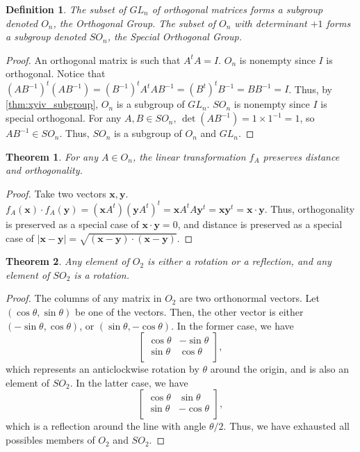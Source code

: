\documentclass{article}
\newtheorem{theorem}{Theorem}[section]
\newtheorem{definition}{Definition}[section]
\begin{document}
\begin{definition}
    \label{def:ortho_group}
    The subset of $GL_n$ of orthogonal matrices forms a subgroup denoted $O_n$, the \emph{Orthogonal Group}.
    The subset of $O_n$ with determinant $+1$ forms a subgroup denoted $SO_n$, the \emph{Special Orthogonal Group}.
\end{definition}
\begin{proof}
    An orthogonal matrix is such that $A^{t}A = I.$
    $O_n$ is nonempty since $I$ is orthogonal.
    Notice that $(AB^{-1})^{t}(AB^{-1}) = (B^{-1})^{t}A^{t}AB^{-1} = (B^{t})^{t}B^{-1} = BB^{-1} = I$.
    Thus, by \autoref{thm:xyiv_subgroup}, $O_n$ is a subgroup of $GL_n$.
    $SO_n$ is nonempty since $I$ is special orthogonal.
    For any $A,B \in SO_n$, $\det(AB^{-1}) = 1\times1^{-1} = 1$, so $AB^{-1} \in SO_n$.
    Thus, $SO_n$ is a subgroup of $O_n$ and $GL_n$.
\end{proof}

\begin{theorem}
    For any $A \in O_n$, the linear transformation $f_A$ preserves distance and orthogonality.
\end{theorem}
\begin{proof}
    Take two vectors $\mathbf{x},\mathbf{y}$.
    $f_A(\mathbf{x}) \cdot f_A(\mathbf{y}) 
    = (\mathbf{x}A^{t})(\mathbf{y}A^{t})^{t}
    = \mathbf{x}A^{t}A\mathbf{y}^{t}
    = \mathbf{x}\mathbf{y}^{t}
    = \mathbf{x}\cdot\mathbf{y} $.
    Thus, orthogonality is preserved as a special case of $\mathbf{x}\cdot\mathbf{y} = 0$,
    and distance is preserved as a special case of $|\mathbf{x}-\mathbf{y}| = \sqrt{(\mathbf{x}-\mathbf{y})\cdot(\mathbf{x}-\mathbf{y})}$.
\end{proof}

\begin{theorem}
    Any element of $O_2$ is either a rotation or a reflection,
    and any element of $SO_2$ is a rotation.
\end{theorem}
\begin{proof}
    The columns of any matrix in $O_2$ are two orthonormal vectors.
    Let $(\cos\theta, \sin\theta)$ be one of the vectors.
    Then, the other vector is either $(-\sin\theta, \cos\theta)$,  or $(\sin\theta, -\cos\theta)$.
    In the former case, we have
    \[\begin{bmatrix}
        \cos\theta & -\sin\theta \\
        \sin\theta & \cos\theta \\
    \end{bmatrix},\]
    which represents an anticlockwise rotation by $\theta$ around the origin, and is also an element of $SO_2$.
    In the latter case, we have
    \[\begin{bmatrix}
        \cos\theta & \sin\theta \\
        \sin\theta & -\cos\theta \\
    \end{bmatrix},\]
    which is a reflection around the line with angle $\theta/2$.
    Thus, we have exhausted all possibles members of $O_2$ and $SO_2$.
\end{proof}
\end{document}
